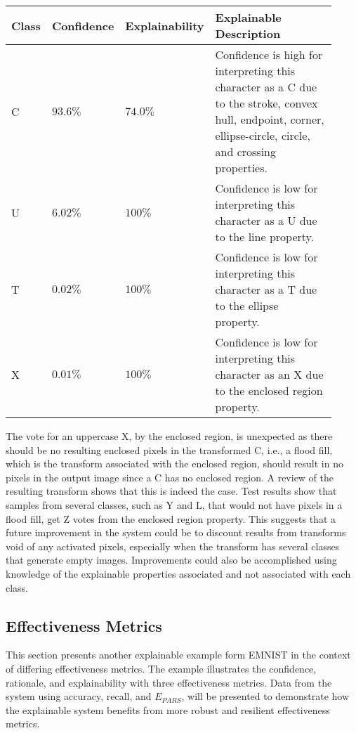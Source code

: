 \begin{table}[H]
    \renewcommand{\arraystretch}{1.3}
     \label{table:emnist_example2_explanation}
    \begin{tabular}{| m{0.06\linewidth} | m{0.14\linewidth} | m{0.17\linewidth} | m{0.55\linewidth} |}
    \hline
     Class & Confidence & Explainability & Explainable Description \\
    \hline \hline
    C & $93.6\%$ & $74.0\%$ & Confidence is high for interpreting this character as a C due to the stroke, convex hull, endpoint, corner, ellipse-circle, circle, and crossing properties. \\ 
    \hline
    U & $6.02\%$ & $100\%$ & Confidence is low for interpreting this character as a U due to the line property. \\
    \hline
    T & $0.02\%$ & $100\%$ & Confidence is low for interpreting this character as a T due to the ellipse property. \\
    \hline
    X & $0.01\%$ & $100\%$ & Confidence is low for interpreting this character as an X due to the enclosed region property. \\ 
    \hline
    \end{tabular}
\end{table}

The vote for an uppercase X, by the enclosed region, is unexpected as there
should be no resulting enclosed pixels in the transformed C, i.e., a flood fill,
which is the transform associated with the enclosed region, should result in no
pixels in the output image since a C has no enclosed region. A review of the
resulting transform shows that this is indeed the case.  Test results show that
samples from several classes, such as Y and L, that would not have pixels in a
flood fill, get Z votes from the enclosed region property.  This suggests that a
future improvement in the system could be to discount results from transforms
void of any activated pixels, especially when the transform has several classes
that generate empty images.  Improvements could also be accomplished using
knowledge of the explainable properties associated and not associated with each
class.


\subsection{Effectiveness Metrics}

This section presents another explainable example form EMNIST in the context of
differing effectiveness metrics.  The example illustrates the confidence,
rationale, and explainability with three effectiveness metrics. Data from the
system using accuracy, recall, and $E_{PARS}$, will be presented to demonstrate
how the explainable system benefits from more robust and resilient effectiveness
metrics.


